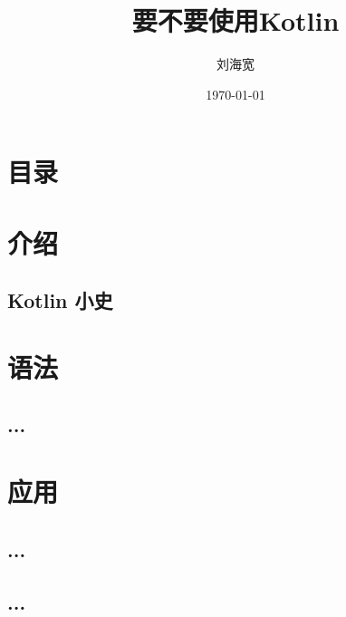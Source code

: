 \documentclass{beamer}
\title{要不要使用Kotlin}
\author{刘海宽}
\date{\today}
\begin{document}
\begin{frame}
  \titlepage
\end{frame}

\section*{目录}
\begin{frame}
  \tableofcontents
\end{frame}

\section{介绍}
\subsection{Kotlin 小史} 

\section{语法}
\subsection{...}

\section{应用} %
\subsection{...}
\subsection{...}

\begin{frame}
\end{frame}
\end{document}
